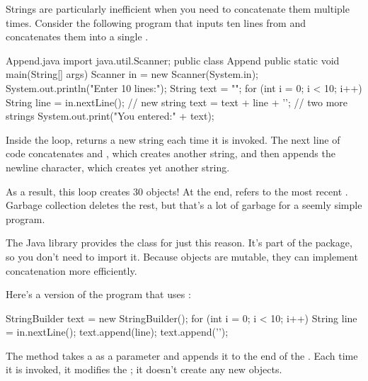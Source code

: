 
Strings are particularly inefficient when you need to concatenate them multiple times.
Consider the following program that inputs ten lines from  and concatenates them into a single .


\begin{trinket}[325]{Append.java}
import java.util.Scanner;
public class Append {
    public static void main(String[] args) {
        Scanner in = new Scanner(System.in);
        System.out.println("Enter 10 lines:");
        String text = "";
        for (int i = 0; i < 10; i++) {
            String line = in.nextLine();        // new string
            text = text + line + '\n';    // two more strings
        }
        System.out.print("You entered:\n" + text);
    }
}
\end{trinket}

Inside the  loop,  returns a new string each time it is invoked.
The next line of code concatenates  and , which creates another string, and then appends the newline character, which creates yet another string.

As a result, this loop creates 30  objects!
At the end,  refers to the most recent .
Garbage collection deletes the rest, but that's a lot of garbage for a seemly simple program.


The Java library provides the  class for just this reason.
It's part of the  package, so you don't need to import it.
Because  objects are mutable, they can implement concatenation more efficiently.

Here's a version of the program that uses :


\begin{code}
StringBuilder text = new StringBuilder();
for (int i = 0; i < 10; i++) {
    String line = in.nextLine();
    text.append(line);
    text.append('\n');
}
\end{code}

The  method takes a  as a parameter and appends it to the end of the .
Each time it is invoked, it modifies the ; it doesn't create any new objects.

